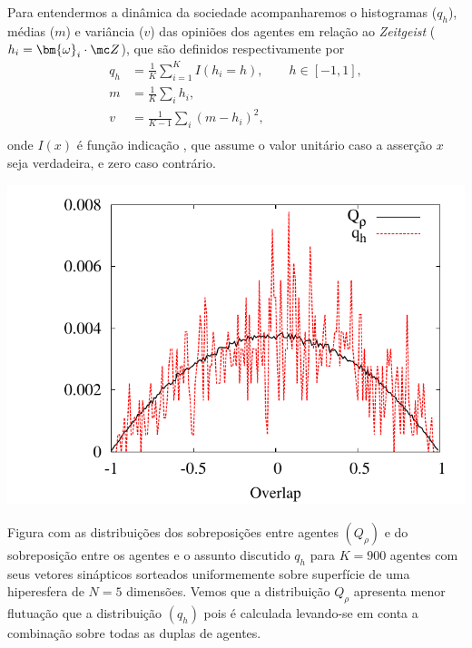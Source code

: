 Para entendermos a dinâmica da sociedade acompanharemos o histogramas ($q_h$),
médias ($m$) e variância ($v$) das opiniões dos agentes em relação ao
\textit{Zeitgeist} ($h_i = \bm{\omega}_i\cdot\mc Z$), que são definidos
respectivamente por
\begin{align}
q_h &= \frac{1}{K}\sum_{i=1}^K I\left( h_{i} = h \right), 
        \qquad h \in \left[-1, 1\right],\label{eq:overI1} \\
m &= \frac{1}{K}\sum_{i} h_{i}, \label{eq:M}\\
v &= \frac{1}{K-1}\sum_{i} \left(m - h_{i}\right)^2, \label{eq:V}\\
\end{align}
onde $ I \left( x \right) $ é função indicação , que assume o valor unitário
caso a asserção $ x$ seja verdadeira, e zero caso contrário. 

\begin{marginfigure}
\center
\includegraphics[width = \textwidth]{Figures/Ovelap_Vetores_Uniforme_Dim5_N900}
\caption{
    Figura com as distribuições dos sobreposições entre agentes $(Q_\rho)$
    e do sobreposição entre os agentes e o assunto discutido $q_h$ para
    $K = 900$ agentes com seus vetores sinápticos sorteados uniformemente
    sobre superfície de uma hiperesfera de $N=5$ dimensões. Vemos que a
    distribuição $Q_\rho$ apresenta menor flutuação que a distribuição
    $(q_h)$ pois é calculada levando-se em conta a combinação sobre todas
    as duplas de agentes.
}
\label{fig:J_uniform}
\end{marginfigure} 

